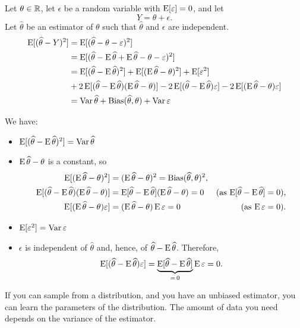 \documentclass[12pt]{amsart}
\begin{document}
 Let $\theta\in\mathbb{R}$, let $\epsilon$ be a random variable with $\operatorname{E}[\varepsilon]=0$, and let
 \[
     Y = \theta + \epsilon.
\]
Let $\hat\theta$ be an estimator of $\theta$ such that $\hat\theta$ and $\epsilon$ are independent.
\begin{align*}
    \operatorname{E}[(\widehat\theta - Y)^2]
    &= \operatorname{E}[(\widehat\theta - \theta - \varepsilon)^2]\\
    &= \operatorname{E}[(\widehat\theta - \operatorname{E}\widehat\theta + \operatorname{E}\widehat\theta - \theta - \varepsilon)^2]\\
    &= \operatorname{E}[(\widehat\theta - \operatorname{E}\widehat\theta)^2] 
    + \operatorname{E}[(\operatorname{E}\widehat\theta - \theta)^2] 
    + \operatorname{E}[\varepsilon^2]
    \\&+ 2\operatorname{E}[(\widehat\theta - \operatorname{E}\widehat\theta)(\operatorname{E}\widehat\theta - \theta)]
    - 2\operatorname{E}[(\widehat\theta - \operatorname{E}\widehat\theta)\varepsilon]
    - 2\operatorname{E}[(\operatorname{E}\widehat\theta - \theta)\varepsilon]\\
    &= \operatorname{Var} \widehat\theta + \operatorname{Bias}(\widehat\theta,\theta) + \operatorname{Var}\varepsilon
\end{align*}

We have:
\begin{itemize}
    \setlength\itemsep{0.5em}
    \item $\operatorname{E}[(\widehat\theta - \operatorname{E}\widehat\theta)^2] = \operatorname{Var} \widehat\theta$
    \item $\operatorname{E}\widehat\theta - \theta$ is a constant, so
    \begin{align*}
        \operatorname{E}[(\operatorname{E}\widehat\theta - \theta)^2] &= (\operatorname{E}\widehat\theta - \theta)^2 = \operatorname{Bias}(\widehat\theta,\theta)^2,\\
        \operatorname{E}[(\widehat\theta - \operatorname{E}\widehat\theta)(\operatorname{E}\widehat\theta - \theta)] &= \operatorname{E}[\widehat\theta - \operatorname{E}\widehat\theta](\operatorname{E}\widehat\theta - \theta)=0 &\text{(as $\operatorname{E}[\widehat\theta - \operatorname{E}\widehat\theta]=0$),}\\
        \operatorname{E}[(\operatorname{E}\widehat\theta - \theta)\varepsilon] &= (\operatorname{E}\widehat\theta - \theta)
        \operatorname{E}\varepsilon=0&\text{(as $\operatorname{E}\varepsilon=0$).}
    \end{align*}
    \item $\operatorname{E}[\varepsilon^2]=\operatorname{Var} \varepsilon$
    \item $\epsilon$ is independent of $\hat\theta$ and, hence, of $\widehat\theta-\operatorname{E}\widehat\theta$.
    Therefore,
    \[\operatorname{E}[(\widehat\theta - \operatorname{E}\widehat\theta)\varepsilon] = 
    \underbrace{\operatorname{E}[\widehat\theta - \operatorname{E}\widehat\theta]}_{=\,0}\operatorname{E}\varepsilon = 0.\]
\end{itemize}

If you can sample from a distribution, and you have an unbiased estimator, you can learn the parameters of the distribution. The amount of data you need depends on the variance of the estimator.
\end{document}

